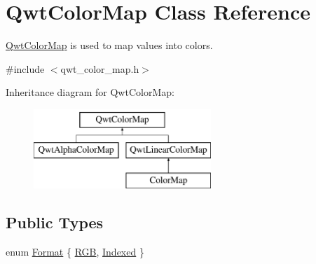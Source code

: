 \hypertarget{class_qwt_color_map}{\section{Qwt\-Color\-Map Class Reference}
\label{class_qwt_color_map}
}


\hyperlink{class_qwt_color_map}{Qwt\-Color\-Map} is used to map values into colors.  




{\ttfamily \#include $<$qwt\-\_\-color\-\_\-map.\-h$>$}

Inheritance diagram for Qwt\-Color\-Map\-:\begin{figure}[H]
\begin{center}
\leavevmode
\includegraphics[height=3.000000cm]{class_qwt_color_map}
\end{center}
\end{figure}
\subsection*{Public Types}
\begin{DoxyCompactItemize}
\item 
enum \hyperlink{class_qwt_color_map_a9e5570790910fa3894887bca7dc5a670}{Format} \{ \hyperlink{class_qwt_color_map_a9e5570790910fa3894887bca7dc5a670a663473fd836d9a84fe48ae1755de326a}{R\-G\-B}, 
\hyperlink{class_qwt_color_map_a9e5570790910fa3894887bca7dc5a670a304cb055c004223ca77f1a4cbbf27ea2}{Indexed}
 \}
\end{DoxyCompactItemize}
